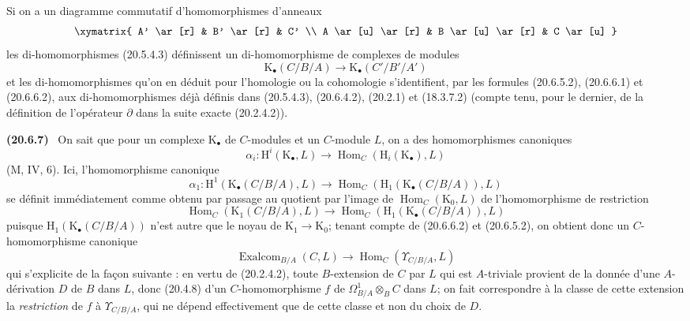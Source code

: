 \documentclass[10pt,oneside]{book}
\makeatletter
\newcommand{\setmanualcurrentlabel}[1]{\def\@currentlabel{#1}}
\newenvironment{env}[1][]{\setmanualcurrentlabel{#1}\par\medskip\noindent\textbf{(#1)}\ }{\par}
\makeatother
\begin{document}
Si on a un diagramme commutatif d'homomorphismes d'anneaux
\[
\xymatrix{
  A' \ar[r] & B' \ar[r] & C' \\
  A \ar[u] \ar[r] & B \ar[u] \ar[r] & C \ar[u]
}
\]
les di-homomorphismes (20.5.4.3) définissent un di-homomorphisme de
complexes de modules
\begin{equation}
\tag{20.6.6.4}
\label{0.20.6.6.4-fr}
  \mathrm{K}_\bullet(C/B/A)\longrightarrow
  \mathrm{K}_\bullet(C'/B'/A')
\end{equation}
et les di-homomorphismes qu'on en déduit pour l'homologie ou la
cohomologie s'identifient, par les formules (20.6.5.2), (20.6.6.1) et
(20.6.6.2), aux di-homomorphismes déjà définis dans (20.5.4.3),
(20.6.4.2), (20.2.1) et (18.3.7.2) (compte tenu, pour le dernier, de la
définition de l'opérateur $\partial$ dans la suite exacte (20.2.4.2)).

\begin{env}[20.6.7]
\label{0.20.6.7-fr}
On sait que pour un complexe $\mathrm{K}_\bullet$ de $C$-modules et un
$C$-module $L$, on a des homomorphismes canoniques
\[
  \alpha_i:\mathrm{H}^i(\mathrm{K}_\bullet,L)\longrightarrow
  \operatorname{Hom}_C(\mathrm{H}_i(\mathrm{K}_\bullet),L)
\]
(M, IV, 6). Ici, l'homomorphisme canonique
\[
  \alpha_1:\mathrm{H}^1(\mathrm{K}_\bullet(C/B/A),L)
  \longrightarrow
  \operatorname{Hom}_C(\mathrm{H}_1(\mathrm{K}_\bullet(C/B/A)),L)
\]
se définit immédiatement comme obtenu par passage au quotient par l'image
de $\operatorname{Hom}_C(\mathrm{K}_0,L)$ de l'homomorphisme de restriction
\[
  \operatorname{Hom}_C(\mathrm{K}_1(C/B/A),L)\longrightarrow
  \operatorname{Hom}_C(\mathrm{H}_1(\mathrm{K}_\bullet(C/B/A)),L)
\]
puisque $\mathrm{H}_1(\mathrm{K}_\bullet(C/B/A))$ n'est autre que le
noyau de $\mathrm{K}_1\to\mathrm{K}_0$; tenant compte de (20.6.6.2) et
(20.6.5.2), on obtient donc un $C$-homomorphisme canonique
\begin{equation}
\tag{20.6.7.1}
\label{0.20.6.7.1-fr}
  \operatorname{Exalcom}_{B/A}(C,L)\longrightarrow
  \operatorname{Hom}_C(\Upsilon_{C/B/A},L)
\end{equation}
qui s'explicite de la façon suivante : en vertu de (20.2.4.2), toute
$B$-extension de $C$ par $L$ qui est $A$-triviale provient de la donnée
d'une $A$-dérivation $D$ de $B$ dans $L$, donc (20.4.8) d'un
$C$-homomorphisme $f$ de $\Omega^1_{B/A}\otimes_B C$ dans $L$; on fait
correspondre à la classe de cette extension la \emph{restriction} de $f$
à $\Upsilon_{C/B/A}$, qui ne dépend effectivement que de cette classe et
non du choix de $D$.
\end{env}
\end{document}
